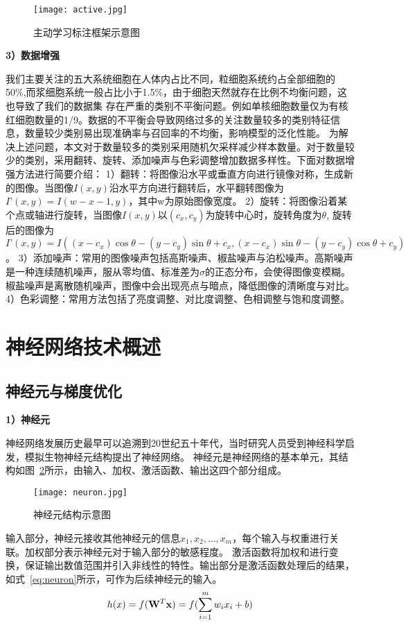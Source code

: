 \begin{figure}[htbp]
  \centering
  \texttt{[image: active.jpg]}
  \caption{主动学习标注框架示意图}
  \label{fig:active}
\end{figure}
\textbf{3）数据增强}

我们主要关注的五大系统细胞在人体内占比不同，粒细胞系统约占全部细胞的50\%,而浆细胞系统一般占比小于1.5\%，由于细胞天然就存在比例不均衡问题，这也导致了我们的数据集
存在严重的类别不平衡问题。例如单核细胞数量仅为有核红细胞数量的1/9。数据的不平衡会导致网络过多的关注数量较多的类别特征信息，数量较少类别易出现准确率与召回率的不均衡，影响模型的泛化性能。
为解决上述问题，本文对于数量较多的类别采用随机欠采样减少样本数量。对于数量较少的类别，采用翻转、旋转、添加噪声与色彩调整增加数据多样性。下面对数据增强\cite{shorten2019survey}方法进行简要介绍：
1）翻转：将图像沿水平或垂直方向进行镜像对称，生成新的图像。当图像$I(x,y)$沿水平方向进行翻转后，水平翻转图像为$I’(x, y)=I(w-x-1,y)$，其中w为原始图像宽度。
2）旋转：将图像沿着某个点或轴进行旋转，当图像$I(x,y)$以$(c_x, c_y)$为旋转中心时，旋转角度为$\theta$, 旋转后的图像为$I’(x, y)=I((x - c_x)\cos\theta - (y - c_y)\sin\theta + c_x, (x - c_x)\sin\theta - (y - c_y)\cos\theta + c_y)$。
3）添加噪声：常用的图像噪声包括高斯噪声、椒盐噪声与泊松噪声。高斯噪声是一种连续随机噪声，服从零均值、标准差为$\sigma$的正态分布，会使得图像变模糊。
椒盐噪声是离散随机噪声，图像中会出现亮点与暗点，降低图像的清晰度与对比。
4）色彩调整：常用方法包括了亮度调整、对比度调整、色相调整与饱和度调整。

\section{神经网络技术概述}
\subsection{神经元与梯度优化}

\textbf{1）神经元}

神经网络发展历史最早可以追溯到20世纪五十年代，当时研究人员受到神经科学启发，模拟生物神经元结构提出了神经网络。
神经元是神经网络的基本单元，其结构如图~\ref{fig:neuron}所示，由输入、加权、激活函数、输出这四个部分组成。
\begin{figure}[htbp]
  \centering
  \texttt{[image: neuron.jpg]}
  \caption{神经元结构示意图}
  \label{fig:neuron}
\end{figure}

输入部分，神经元接收其他神经元的信息$x_1, x_2, \dots, x_m$，每个输入与权重进行关联。加权部分表示神经元对于输入部分的敏感程度。
激活函数将加权和进行变换，保证输出数值范围并引入非线性的特性。输出部分是激活函数处理后的结果，如式~\ref{eq:neuron}所示，可作为后续神经元的输入。
\begin{equation}
  h(x) = f({{\bf{W}}^T}{\bf{x}}) = f(\sum\limits_{i = 1}^m {{w_i}{x_i} + b})
  \label{eq:neuron}
\end{equation}

